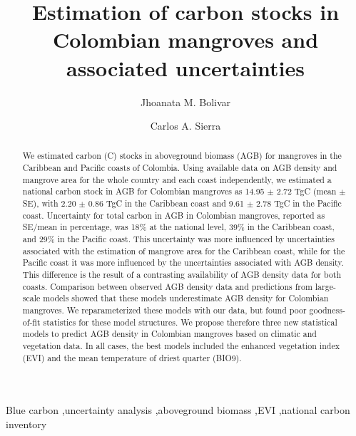 \documentclass[review, authoryear]{elsarticle}   	%
\begin{document}
\begin{frontmatter}

\title{Estimation of carbon stocks in Colombian mangroves and associated uncertainties}
\author[MPI,CYB]{Jhoanata M. Bolivar}
\author[MPI,CYB]{Carlos A. Sierra}
\address[MPI]{Max Planck Institute for Biogeochemistry, Hans-Kn\"oll-Str. 10, 07745 Jena, Germany}
\address[CYB]{Research Center on Ecosystems and Global Change Carbono \& Bosques, Medell\'in, Colombia}



\begin{abstract}
We estimated carbon (C) stocks in aboveground biomass (AGB) for mangroves in the Caribbean and Pacific coasts of Colombia. Using available data on AGB density and mangrove area for the whole country and each coast independently, we estimated a national carbon stock in AGB for Colombian mangroves as 14.95 $\pm$ 2.72 TgC (mean $\pm$ SE), with 2.20 $\pm$ 0.86 TgC in the Caribbean coast and 9.61 $\pm$ 2.78 TgC in the Pacific coast. Uncertainty for total carbon in AGB in Colombian mangroves, reported as SE/mean in percentage, was 18\% at the national level, 39\% in the Caribbean coast, and 29\% in the Pacific coast. This uncertainty was more influenced by uncertainties associated with the estimation of mangrove area for the Caribbean coast, while for the Pacific coast it was more influenced by the uncertainties associated with AGB density. This difference is the result of a contrasting availability of AGB density data for both coasts.  Comparison between observed AGB density data and predictions from large-scale models showed that these models underestimate AGB density for Colombian mangroves. We reparameterized these models with our data, but found poor goodness-of-fit statistics for these model structures. We propose therefore three new statistical models to predict AGB density in Colombian mangroves based on climatic and vegetation data. In all cases, the best models included the enhanced vegetation index (EVI) and the mean temperature of driest quarter (BIO9). 
\end{abstract}

\begin{keyword}
Blue carbon \sep uncertainty analysis \sep aboveground biomass \sep EVI \sep national carbon inventory
\end{keyword}

\end{frontmatter}
\end{document}
